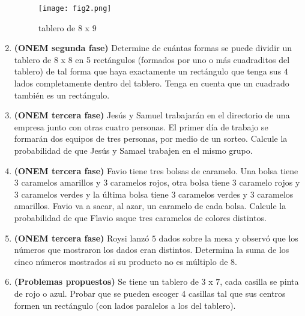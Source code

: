 \documentclass[10pt,a4 paper]{article}
\begin{document}
\begin{enumerate}
\begin{figure}[!ht]
\begin{center}
  \texttt{[image: fig2.png]}
  \caption{tablero de $8$ x $9$}
\end{center}
\end{figure}

\item \textbf{(ONEM segunda fase)} Determine de cu\'antas formas se puede dividir un tablero de $8$ x $8$ en 5 rect\'angulos (formados por uno o m\'as cuadraditos del tablero) de tal forma que haya exactamente un rect\'angulo que tenga sus $4$ lados completamente dentro del tablero. Tenga en cuenta que un cuadrado tambi\'en es un rect\'angulo.

\item \textbf{(ONEM tercera fase)} Jes\'us y Samuel trabajar\'an en el directorio de una empresa junto con otras cuatro personas. El primer d\'ia de trabajo se formar\'an dos equipos de tres personas, por medio de un sorteo. Calcule la probabilidad de que Jes\'us y Samael trabajen en el mismo grupo.

\item \textbf{(ONEM tercera fase)} Favio tiene tres bolsas de caramelo. Una bolsa tiene $3$ caramelos amarillos y $3$ caramelos rojos, otra bolsa tiene $3$ caramelo rojos y $3$ caramelos verdes y la \'ultima bolsa tiene $3$ caramelos verdes y $3$ caramelos amarillos. Favio va a sacar, al azar, un caramelo de cada bolsa. Calcule la probabilidad de que Flavio saque tres caramelos de colores distintos. 

\item \textbf{(ONEM tercera fase)} Roysi lanz\'o $5$ dados sobre la mesa y observ\'o que los n\'umeros que mostraron los dados eran distintos. Determina la suma de los cinco n\'umeros mostrados si su producto no es m\'ultiplo de 8.

\item \textbf{(Problemas propuestos)} Se tiene un tablero de $3$ x $7$, cada casilla se pinta de rojo o azul. Probar que se pueden escoger 4 casillas tal que sus centros formen un rect\'angulo (con lados paralelos a los del tablero). 



\end{enumerate}
\end{document}
